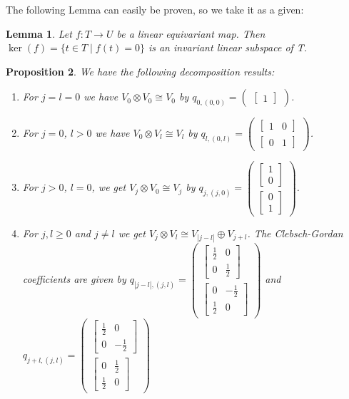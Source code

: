 \documentclass[12pt, a4paper]{article}
\theoremstyle{plain}
\newtheorem{pro}{Proposition}[section]
\newtheorem{lem}[pro]{Lemma}
\theoremstyle{definition}
\theoremstyle{remark}
\begin{document}
The following Lemma can easily be proven, so we take it as a given:

\begin{lem}\label{kernel invariant subspace}
Let $f: T \to U$ be a linear equivariant map. Then $\ker(f) = \{t \in T \mid f(t) = 0\}$ is an invariant linear subspace of T.
\end{lem}

\begin{pro}\label{decomposition_results}
We have the following decomposition results:
\begin{enumerate}
\item For $j = l = 0$ we have $V_0 \otimes V_0 \cong V_0$ by $q_{0,(0,0)} = \begin{pmatrix} \begin{bmatrix} 1 \end{bmatrix}\end{pmatrix}$.
\item For $j=0$, $l > 0$ we have $V_0 \otimes V_l \cong V_l$ by $q_{l,(0,l)} = \begin{pmatrix}\begin{bmatrix} 1 & 0\end{bmatrix} \\ \begin{bmatrix} 0 & 1\end{bmatrix}\end{pmatrix}$. \item For $j > 0$, $l = 0$, we get $V_j \otimes V_0 \cong V_j$ by $q_{j,(j,0)} = \begin{pmatrix} \begin{bmatrix}1 \\ 0 \end{bmatrix} \\ \begin{bmatrix} 0 \\ 1\end{bmatrix}\end{pmatrix}$.
\item For $j, l \geq 0$ and $j \neq l$ we get $V_j \otimes V_l \cong V_{|j-l|} \oplus V_{j+l}$. The Clebsch-Gordan coefficients are given by $q_{|j-l|,(j,l)} =\begin{pmatrix}\begin{bmatrix} \frac{1}{2} & 0 \\ 0 & \frac{1}{2}\end{bmatrix} \\ \begin{bmatrix} 0 & -\frac{1}{2} \\ \frac{1}{2} & 0\end{bmatrix} \end{pmatrix}$ and $q_{j+l,(j,l)} = \begin{pmatrix}\begin{bmatrix} \frac{1}{2} & 0 \\ 0 & -\frac{1}{2}\end{bmatrix} \\ \begin{bmatrix} 0 & \frac{1}{2} \\ \frac{1}{2} & 0\end{bmatrix} \end{pmatrix}$

\end{enumerate}
\end{pro}
\end{document}
